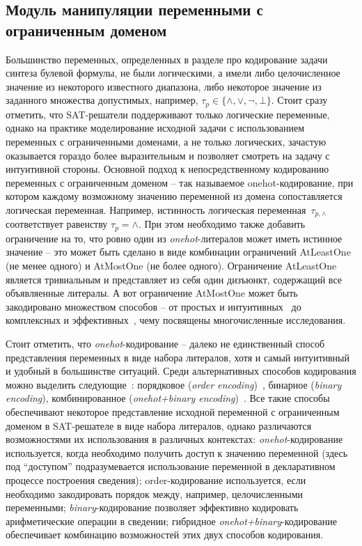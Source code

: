 \subsection{Модуль манипуляции переменными с ограниченным доменом}

Большинство переменных, определенных в разделе про кодирование задачи синтеза булевой формулы, не были логическими, а имели либо целочисленное значение из некоторого известного диапазона, либо некоторое значение из заданного множества допустимых, например, $\tau_{p} \in \{ \land, \lor, \neg, \bot \}$.
Стоит сразу отметить, что SAT-решатели поддерживают только логические переменные, однако на практике моделирование исходной задачи с использованием переменных с ограниченными доменами, а не только логических, зачастую оказывается гораздо более выразительным и позволяет смотреть на задачу с интуитивной стороны.
Основной подход к непосредственному кодированию переменных с ограниченным доменом \--- так называемое onehot-кодирование, при котором каждому возможному значению переменной из домена сопоставляется логическая переменная.
Например, истинность логическая переменная~$\tau_{p, \land}$ соответствует равенству $\tau_{p} = \land$.
При этом необходимо также добавить ограничение на то, что ровно один из \textit{onehot}-литералов может иметь истинное значение \--- это может быть сделано в виде комбинации ограничений AtLeastOne (не менее одного) и AtMostOne (не более одного).
Ограничение AtLeastOne является тривиальным и представляет из себя один дизъюнкт, содержащий все объявляенные литералы. А вот ограничение AtMostOne может быть закодировано множеством способов \--- от простых и интуитивных~\cite{walsh2000} до комплексных и эффективных~\cite{nguyen2015}, чему посвящены многочисленные исследования.

Стоит отметить, что \textit{onehot}-кодирование \--- далеко не единственный способ представления переменных в виде набора литералов, хотя и самый интуитивный и удобный в большинстве ситуаций.
Среди альтернативных способов кодирования можно выделить следующие~\cite{sat-encodings}: порядковое (\textit{order encoding})~\cite{order-encoding}, бинарное (\textit{binary encoding}), комбинированное (\textit{onehot+binary encoding})~\cite{sat-encodings}.
Все такие способы обеспечивают некоторое представление исходной переменной с ограниченным доменом в SAT-решателе в виде набора литералов, однако различаются возможностями их использования в различных контекстах: \textit{onehot}-кодирование используется, когда необходимо получить доступ к значению переменной (здесь под \enquote{доступом} подразумевается использование переменной в декларативном процессе построения сведения); order-кодирование используется, если необходимо закодировать порядок между, например, целочисленными переменными; \textit{binary}-кодирование позволяет эффективно кодировать арифметические операции в сведении; гибридное \textit{onehot+binary}-кодирование обеспечивает комбинацию возможностей этих двух способов кодирования.

